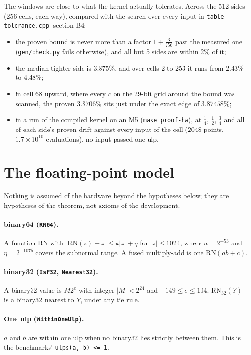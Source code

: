 \documentclass[11pt]{article}
\newcommand{\lean}[1]{{\small\texttt{#1}}}
\newcommand{\RN}{\mathrm{RN}}
\begin{document}
The windows are close to what the kernel actually tolerates. Across the 512 sides
(256 cells, each way), compared with the search over every input in
\lean{table-tolerance.cpp}, section B4:

\begin{itemize}
\item the proven bound is never more than a factor $1 + \tfrac{3}{256}$ past the measured one
(\lean{gen/check.py} fails otherwise), and all but 5 sides are within 2\% of it;
\item the median tighter side is $3.875\%$, and over cells 2 to 253 it runs from
$2.43\%$ to $4.48\%$;
\item in cell 68 upward, where every $c$ on the 29-bit grid around the bound was
scanned, the proven $3.8706\%$ sits just under the exact edge of $3.87458\%$;
\item in a run of the compiled kernel on an M5 (\lean{make proof-hw}), at $\tfrac14$, $\tfrac12$,
$\tfrac34$ and all of each side's proven drift against every input of the cell (2048
points, $1.7 \times 10^{10}$ evaluations), no input passed one ulp.
\end{itemize}

\section{The floating-point model}\label{sec:model}

Nothing is assumed of the hardware beyond the hypotheses below; they are hypotheses of
the theorem, not axioms of the development.

\paragraph{binary64 (\lean{RN64}).} A function $\RN$ with
$|\RN(z) - z| \le u|z| + \eta$ for $|z| \le 1024$, where $u = 2^{-53}$ and
$\eta = 2^{-1075}$ covers the subnormal range. A fused multiply-add is one
$\RN(ab + c)$.

\paragraph{binary32 (\lean{IsF32}, \lean{Nearest32}).} A binary32 value is $M 2^e$
with integer $|M| < 2^{24}$ and $-149 \le e \le 104$. $\RN_{32}(Y)$ is a binary32
nearest to $Y$, under any tie rule.

\paragraph{One ulp (\lean{WithinOneUlp}).} $a$ and $b$ are within one ulp when no
binary32 lies strictly between them. This is the benchmarks' \texttt{ulps(a, b) <= 1}.
\end{document}
